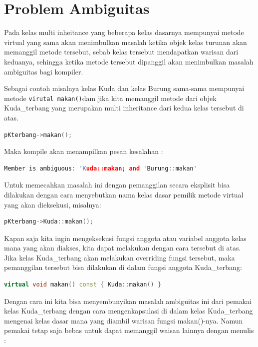 \section{Problem Ambiguitas}\label{problem-ambiguitas}

Pada kelas multi inheitance yang beberapa kelas dasarnya mempunyai
metode virtual yang sama akan menimbulkan masalah ketika objek kelas
turunan akan memanggil metode tersebut, sebab kelas tersebut mendapatkan
warisan dari keduanya, sehingga ketika metode tersebut dipanggil akan
menimbulkan masalah ambiguitas bagi kompiler.

Sebagai contoh misalnya kelas Kuda dan kelas Burung sama-sama mempunyai
metode \texttt{virutal\ makan()}dam jika kita memanggil metode dari
objek Kuda\_terbang yang merupakan multi inheritance dari kedua kelas
tersebut di atas.

\begin{lstlisting}[language=c++, numbers=none]
pKterbang->makan();
\end{lstlisting}

Maka kompile akan menampilkan pesan kesalahan :

\begin{lstlisting}[language=c++, numbers=none]
Member is ambiguous: 'Kuda::makan; and 'Burung::makan'
\end{lstlisting}

Untuk memecahkan masalah ini dengan pemanggilan secara eksplisit bisa
dilakukan dengan cara menyebutkan nama kelas dasar pemilik metode
virtual yang akan dieksekusi, misalnya:

\begin{lstlisting}[language=c++, numbers=none]
pKterbang->Kuda::makan();
\end{lstlisting}

Kapan saja kita ingin mengeksekusi fungsi anggota atau variabel anggota
kelas mana yang akan diakses, kita dapat melakukan dengan cara tersebut
di atas. Jika kelas Kuda\_terbang akan melakukan overriding fungsi
tersebut, maka pemanggilan tersebut bisa dilakukan di dalam fungsi
anggota Kuda\_terbang:

\begin{lstlisting}[language=c++, numbers=none]
virtual void makan() const { Kuda::makan() }
\end{lstlisting}

Dengan cara ini kita bisa menyembunyikan masalah ambiguitas ini dari
pemakai kelas Kuda\_terbang dengan cara mengenkapsulasi di dalam kelas
Kuda\_terbang mengenai kelas dasar mana yang diambil warisan fungsi
makan()-nya. Namun pemakai tetap saja bebas untuk dapat memanggil waisan
lainnya dengan menulis :

